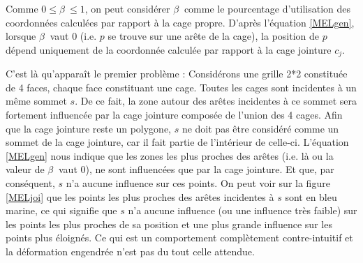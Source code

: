 Comme $0 \leq \beta~ \leq 1$, on peut considérer $\beta~$ comme le
pourcentage d'utilisation des coordonnées calculées par rapport à la
cage propre. D'après l'équation \ref{MELgen}, lorsque $\beta~$ vaut 0
(i.e. $p$ se trouve sur une arête de la cage), la position de $p$
dépend uniquement de la coordonnée calculée par rapport à la cage
jointure $c_j$.

C'est là qu'apparaît le premier problème : Considérons une grille 2*2
constituée de 4 faces, chaque face constituant une cage. Toutes les
cages sont incidentes à un même sommet $s$. De ce fait, la zone autour
des arêtes incidentes à ce sommet sera fortement influencée par la
cage jointure composée de l'union des 4 cages. Afin que la cage
jointure reste un polygone, $s$ ne doit pas être considéré comme un
sommet de la cage jointure, car il fait partie de l'intérieur de
celle-ci. L'équation \ref{MELgen} nous indique que les zones les plus
proches des arêtes (i.e. là ou la valeur de $\beta~$ vaut 0), ne sont
influencées que par la cage jointure. Et que, par conséquent, $s$ n'a
aucune influence sur ces points. On peut voir sur la figure
\ref{MELjoi} que les points les plus proches des arêtes incidentes à
$s$ sont en bleu marine, ce qui signifie que $s$ n'a aucune influence
(ou une influence très faible) sur les points les plus proches de sa
position et une plus grande influence sur les points plus éloignés. Ce
qui est un comportement complètement contre-intuitif et la déformation
engendrée n'est pas du tout celle attendue.

